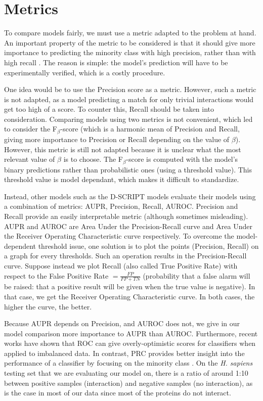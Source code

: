 \documentclass[11pt,a4paper]{article}
\begin{document}
\section{Metrics}

To compare models fairly, we must use a metric adapted to the problem at hand. An important property of the metric to be considered is that it should give more importance to predicting the minority class with high precision, rather than with high recall \cite{metrics}. The reason is simple: the model's prediction will have to be experimentally verified, which is a costly procedure.

One idea would be to use the Precision score as a metric. However, such a metric is not adapted, as a model predicting a match for only trivial interactions would get too high of a score. To counter this, Recall should be taken into consideration. Comparing models using two metrics is not convenient, which led to consider the F$_\beta$-score (which is a harmonic mean of Precision and Recall, giving more importance to Precision or Recall depending on the value of $\beta$). However, this metric is still not adapted because it is unclear what the most relevant value of $\beta$ is to choose. The F$_\beta$-score is computed with the model's binary predictions rather than probabilistic ones (using a threshold value). This threshold value is model dependant, which makes it difficult to standardize.

Instead, other models such as the D-SCRIPT models evaluate their models using a combination of metrics:  AUPR, Precision, Recall, AUROC. Precision and Recall provide an easily interpretable metric (although sometimes misleading). AUPR and AUROC are Area Under the Precision-Recall curve and Area Under the Receiver Operating Characteristic curve respectively. To overcome the model-dependent threshold issue, one solution is to plot the points (Precision, Recall) on a graph for every thresholds. Such an operation results in the Precision-Recall curve. Suppose instead we plot Recall (also called True Positive Rate) with respect to the False Positive Rate $= \frac{FP}{FP+TN}$ (probability that a false alarm will be raised: that a positive result will be given when the true value is negative). In that case, we get the Receiver Operating Characteristic curve. In both cases, the higher the curve, the better.

Because AUPR depends on Precision, and AUROC does not, we give in our model comparison more importance to AUPR than AUROC. Furthermore, recent works have shown that ROC can give overly-optimistic scores for classifiers when applied to imbalanced data. In contrast, PRC provides better insight into the performance of a classifier by focusing on the minority class \cite{limit_ROC}. On the \emph{H. sapiens} testing set that we are evaluating our model on, there is a ratio of around 1:10 between positive samples (interaction) and negative samples (no interaction), as is the case in most of our data since most of the proteins do not interact.
\end{document}
